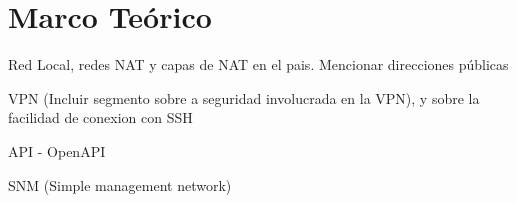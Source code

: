 \section{Marco Teórico}


Red Local, redes NAT y capas de NAT en el pais. Mencionar direcciones públicas

VPN (Incluir segmento sobre a seguridad involucrada en la VPN), y sobre la facilidad de conexion con SSH

API - OpenAPI

SNM (Simple management network)

